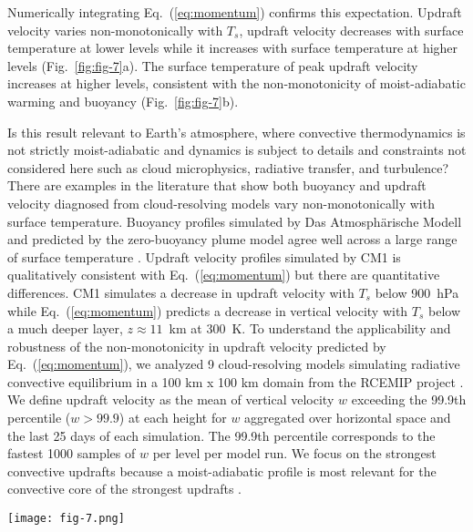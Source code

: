 \documentclass[draft]{ametsocV6.1}
\begin{document}
Numerically integrating Eq.~(\ref{eq:momentum}) confirms this expectation. Updraft velocity varies non-monotonically with $T_s$, updraft velocity decreases with surface temperature at lower levels while it increases with surface temperature at higher levels (Fig.~\ref{fig:fig-7}a). The surface temperature of peak updraft velocity increases at higher levels, consistent with the non-monotonicity of moist-adiabatic warming and buoyancy (Fig.~\ref{fig:fig-7}b).

Is this result relevant to Earth's atmosphere, where convective thermodynamics is not strictly moist-adiabatic and dynamics is subject to details and constraints not considered here such as cloud microphysics, radiative transfer, and turbulence? There are examples in the literature that show both buoyancy and updraft velocity diagnosed from cloud-resolving models vary non-monotonically with surface temperature. Buoyancy profiles simulated by Das Atmosph\"arische Modell and predicted by the zero-buoyancy plume model agree well across a large range of surface temperature \citep[Fig.~2a in][]{seeley2015a}. Updraft velocity profiles simulated by CM1 \cite[Fig.~2 in][]{singh2015} is qualitatively consistent with Eq.~(\ref{eq:momentum}) but there are quantitative differences. CM1 simulates a decrease in updraft velocity with $T_s$ below 900~hPa while Eq.~(\ref{eq:momentum}) predicts a decrease in vertical velocity with $T_s$ below a much deeper layer, $z\approx11$~km at 300~K. To understand the applicability and robustness of the non-monotonicity in updraft velocity predicted by Eq.~(\ref{eq:momentum}), we analyzed 9 cloud-resolving models simulating radiative convective equilibrium in a 100 km x 100 km domain from the RCEMIP project \citep{wing2018}. We define updraft velocity as the mean of vertical velocity $w$ exceeding the 99.9th percentile ($w>{99.9}$) at each height for $w$ aggregated over horizontal space and the last 25 days of each simulation. The 99.9th percentile corresponds to the fastest 1000 samples of $w$ per level per model run. We focus on the strongest convective updrafts because a moist-adiabatic profile is most relevant for the convective core of the strongest updrafts \citep{riehl1958}.

\begin{figure*}[htbp]
 \centering
 \texttt{[image: fig-7.png]}\\
 \caption{(a) Vertical profiles of updraft velocity, calculated by numerically integrating Eq.~(\ref{eq:momentum}) in height using buoyancy $B$ from Eq.~(\ref{eq:buoyancy_def}). Updraft velocity decreases with surface temperature at lower levels while it increases with surface temperature at higher levels. (b) Updraft velocity varies non-monotonically with surface temperature at all levels, e.g. at 5, 10, 15, and 20~km. Updraft velocity peaks at warmer surface temperatures at higher levels consistent with the behavior of buoyancy (Fig.~\ref{fig:fig-6}a) and moist-adiabatic warming (Fig.~\ref{fig:fig-5}).}\label{fig:fig-7}
\end{figure*}
\end{document}
